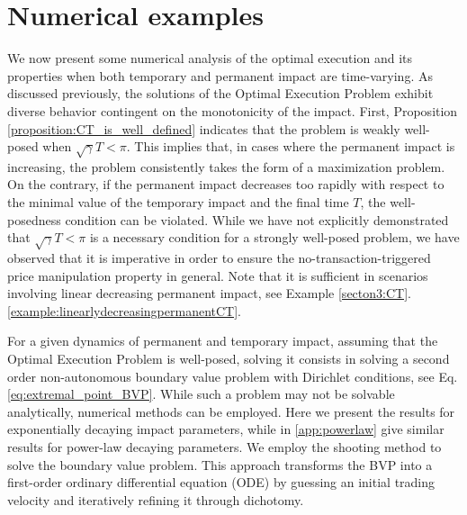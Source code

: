 \documentclass[final,3p,authoryear,12pt]{elsarticle}
\begin{document}
\section{Numerical examples}
\label{sec:numerical}
We now present some numerical analysis of the optimal execution and its properties when both temporary and permanent impact are time-varying. As discussed previously, the solutions of the Optimal Execution Problem exhibit diverse behavior contingent on the monotonicity of the impact. First, Proposition \ref{proposition:CT_is_well_defined} indicates that the problem is weakly well-posed when $\sqrt{\gamma}T < \pi$. This implies that, in cases where the permanent impact is increasing, the problem consistently takes the form of a maximization problem. On the contrary, if the permanent impact decreases too rapidly with respect to the minimal value of the temporary impact and the final time $T$, the well-posedness condition can be violated. While we have not explicitly demonstrated that $\sqrt{\gamma}T < \pi$ is a necessary condition for a strongly well-posed problem, we have observed that it is imperative in order to ensure the no-transaction-triggered price manipulation property in general. Note that it is sufficient in scenarios involving linear decreasing permanent impact, see Example \ref{secton3:CT}.\ref{example:linearlydecreasingpermanentCT}. 

For a given dynamics of permanent and temporary impact, assuming that the Optimal Execution Problem is well-posed, solving it consists in solving a second order non-autonomous boundary value problem with Dirichlet conditions, see Eq. \eqref{eq:extremal_point_BVP}. While such a problem may not be solvable analytically, numerical methods can be employed. Here we present the results for exponentially decaying impact parameters, while in \ref{app:powerlaw} give similar results for power-law decaying parameters. We employ the shooting method \cite{osborne1969shooting} to solve the boundary value problem. This approach transforms the BVP into a first-order ordinary differential equation (ODE) by guessing an initial trading velocity and iteratively refining it through dichotomy.

\end{document}
